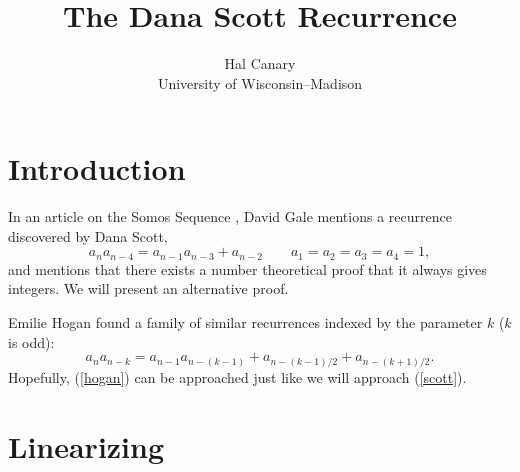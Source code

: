 \documentclass[10pt]{article}
\title{The Dana Scott Recurrence}
\author{{\sc Hal Canary} \\
{\small University of Wisconsin--Madison}}
\begin{document}
\maketitle



\section{Introduction}

In an article on the Somos Sequence \cite{gale91}, David Gale mentions a
recurrence discovered by Dana Scott,
\begin{equation}\label{scott}
a_n a_{n-4} = a_{n-1} a_{n-3} + a_{n-2} \qquad a_1=a_2=a_3=a_4=1,
\end{equation}
and mentions that there exists a number theoretical proof that it
always gives integers. We will present an alternative proof.

Emilie Hogan found a family of similar recurrences indexed by the
parameter $k$ ($k$ is odd):
\begin{equation}\label{hogan}
a_n a_{n-k} = a_{n-1} a_{n-(k-1)} + a_{n-(k-1)/2} + a_{n-(k+1)/2}.
\end{equation}
Hopefully, (\ref{hogan}) can be approached just like we will approach
(\ref{scott}).

\section{Linearizing}
\end{document}
